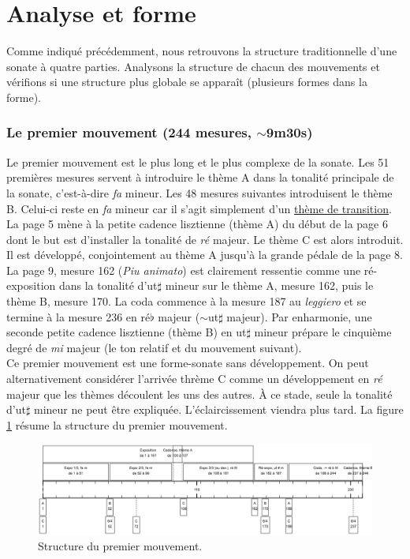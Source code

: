 \section{Analyse et forme}

Comme indiqué précédemment, nous retrouvons la structure traditionnelle d'une sonate à quatre parties. Analysons la structure de chacun des mouvements et vérifions si une structure plus globale se apparaît (plusieurs formes dans la forme).

\subsubsection*{Le premier mouvement (244 mesures, $\sim$9m30s)}

Le premier mouvement est le plus long et le plus complexe de la sonate. Les 51 premières mesures servent à introduire le thème A dans la tonalité principale de la sonate, c'est-à-dire \emph{fa} mineur. Les 48 mesures suivantes introduisent le thème B. Celui-ci reste en \emph{fa} mineur car il s'agit simplement d'un \underline{thème de transition}. La page 5 mène à la petite cadence lisztienne (thème A) du début de la page 6 dont le but est d'installer la tonalité de \emph{ré} majeur. Le thème C est alors introduit. Il est développé, conjointement au thème A jusqu'à la grande pédale de la page 8. La page 9, mesure 162 (\emph{Piu animato}) est clairement ressentie comme une ré-exposition dans la tonalité d'ut$\sharp$ mineur sur le thème A, mesure 162, puis le thème B, mesure 170. La coda commence à la mesure 187 au \emph{leggiero} et se termine à la mesure 236 en ré$\flat$ majeur ($\sim$ut$\sharp$ majeur). Par enharmonie, une seconde petite cadence lisztienne (thème B) en ut$\sharp$ mineur prépare le cinquième degré de \emph{mi} majeur (le ton relatif et du mouvement suivant).\\

Ce premier mouvement est une forme-sonate sans développement. On peut alternativement considérer l'arrivée thrème C comme un développement en \emph{ré} majeur que les thèmes découlent les uns des autres. À ce stade, seule la tonalité d'ut$\sharp$ mineur ne peut être expliquée. L'éclaircissement viendra plus tard. La figure \ref{schema-1} résume la structure du premier mouvement.

\begin{figure}[!ht]
  \begin{bigcenter}
    \includegraphics[width=17.5cm, keepaspectratio]{frise-mvt1.png}
  \end{bigcenter}
  \caption{\label{schema-1}Structure du premier mouvement.}
\end{figure}

